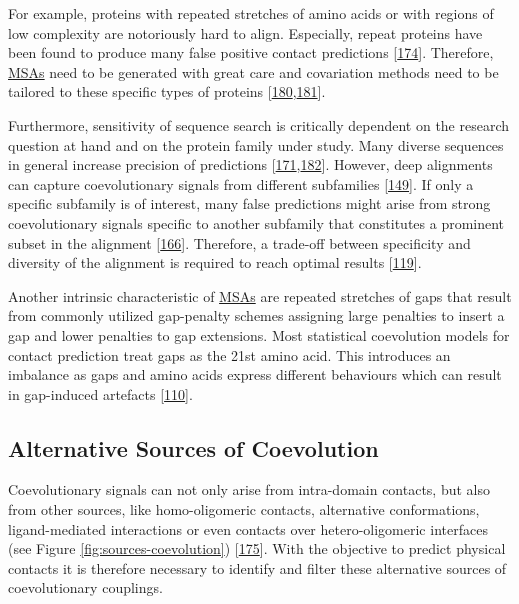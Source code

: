 \documentclass[11pt,a4paper,twoside]{book}
\theoremstyle{definition}
\theoremstyle{definition}
\theoremstyle{remark}
\begin{document}
For example, proteins with repeated stretches of amino acids or with
regions of low complexity are notoriously hard to align. Especially,
repeat proteins have been found to produce many false positive contact
predictions {[}\protect\hyperlink{ref-Anishchenko2017}{174}{]}.
Therefore, \protect\hyperlink{abbrev}{MSAs} need to be generated with
great care and covariation methods need to be tailored to these specific
types of proteins
{[}\protect\hyperlink{ref-Espada2014}{180},\protect\hyperlink{ref-Toth-Petroczy2016}{181}{]}.

Furthermore, sensitivity of sequence search is critically dependent on
the research question at hand and on the protein family under study.
Many diverse sequences in general increase precision of predictions
{[}\protect\hyperlink{ref-Ashkenazy2009}{171},\protect\hyperlink{ref-Avila-Herrera2015a}{182}{]}.
However, deep alignments can capture coevolutionary signals from
different subfamilies {[}\protect\hyperlink{ref-Uguzzoni2017}{149}{]}.
If only a specific subfamily is of interest, many false predictions
might arise from strong coevolutionary signals specific to another
subfamily that constitutes a prominent subset in the alignment
{[}\protect\hyperlink{ref-Franceus2016}{166}{]}. Therefore, a trade-off
between specificity and diversity of the alignment is required to reach
optimal results {[}\protect\hyperlink{ref-Hopf2012}{119}{]}.

Another intrinsic characteristic of \protect\hyperlink{abbrev}{MSAs} are
repeated stretches of gaps that result from commonly utilized
gap-penalty schemes assigning large penalties to insert a gap and lower
penalties to gap extensions. Most statistical coevolution models for
contact prediction treat gaps as the 21st amino acid. This introduces an
imbalance as gaps and amino acids express different behaviours which can
result in gap-induced artefacts
{[}\protect\hyperlink{ref-Feinauer2014}{110}{]}.

\subsection{Alternative Sources of
Coevolution}\label{alternative-sources-of-coevolution}

Coevolutionary signals can not only arise from intra-domain contacts,
but also from other sources, like homo-oligomeric contacts, alternative
conformations, ligand-mediated interactions or even contacts over
hetero-oligomeric interfaces (see Figure \ref{fig:sources-coevolution})
{[}\protect\hyperlink{ref-Marks2012}{175}{]}. With the objective to
predict physical contacts it is therefore necessary to identify and
filter these alternative sources of coevolutionary couplings.
\end{document}
